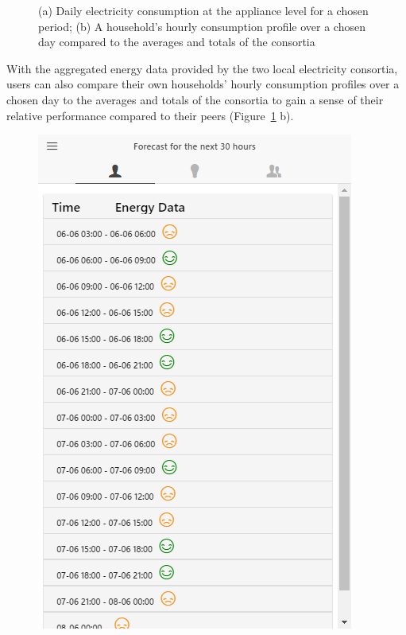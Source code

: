 \begin{figure}
\begin{center}
\begin{minipage}[htb]{0.44\linewidth}
        \end{minipage}
      \end{center}
      \caption{(a) Daily electricity consumption at the appliance level for a chosen period;  (b) 
      A household's hourly consumption profile over a chosen day compared to the averages and totals of the consortia
}
\label{fig:viz_hist}
\end{figure}
With the aggregated energy data provided by the two local electricity consortia, users can also  compare their own households' hourly consumption profiles over a chosen day to the averages and totals of the consortia to gain a sense of their relative performance compared to their peers (Figure~\ref{fig:viz_hist} b). \\

\begin{figure}
      \begin{center}
        \begin{minipage}[htb]{0.45\linewidth}    
        \includegraphics[width=1\linewidth]{img/touprediction.png}

\end{minipage}
\end{center}
\end{figure}

